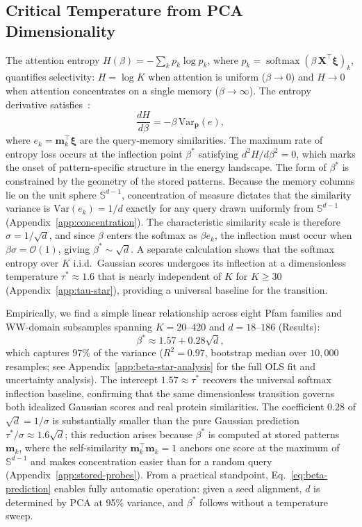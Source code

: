 \subsection{Critical Temperature from PCA Dimensionality}\label{sec:beta-star}
The attention entropy $H(\beta) = -\sum_k p_k \log p_k$, where $p_k = \operatorname{softmax}(\beta\,\mathbf{X}^\top\boldsymbol{\xi})_k$, quantifies selectivity: $H = \log K$ when attention is uniform ($\beta \to 0$) and $H \to 0$ when attention concentrates on a single memory ($\beta \to \infty$). The entropy derivative satisfies~\cite{alswaidanVarnerStochasticAttention2026}:
\begin{equation}\label{eq:entropy-deriv}
    \frac{dH}{d\beta} = -\beta\,\mathrm{Var}_{\mathbf{p}}(e),
\end{equation}
where $e_k = \mathbf{m}_k^\top\boldsymbol{\xi}$ are the query-memory similarities. The maximum rate of entropy loss occurs at the inflection point $\beta^*$ satisfying $d^2H/d\beta^2 = 0$, which marks the onset of pattern-specific structure in the energy landscape. The form of $\beta^*$ is constrained by the geometry of the stored patterns. Because the memory columns lie on the unit sphere $\mathbb{S}^{d-1}$, concentration of measure dictates that the similarity variance is $\mathrm{Var}(e_k) = 1/d$ exactly for any query drawn uniformly from $\mathbb{S}^{d-1}$ (Appendix~\ref{app:concentration}). The characteristic similarity scale is therefore $\sigma = 1/\sqrt{d}$, and since $\beta$ enters the softmax as $\beta e_k$, the inflection must occur when $\beta\sigma = \mathcal{O}(1)$, giving $\beta^* \sim \sqrt{d}$. A separate calculation shows that the softmax entropy over $K$ i.i.d.\ Gaussian scores undergoes its inflection at a dimensionless temperature $\tau^* \approx 1.6$ that is nearly independent of $K$ for $K \geq 30$ (Appendix~\ref{app:tau-star}), providing a universal baseline for the transition.

Empirically, we find a simple linear relationship across eight Pfam families and WW-domain subsamples spanning $K = 20$--$420$ and $d = 18$--$186$ (Results):
\begin{equation}\label{eq:beta-prediction}
    \beta^* \approx 1.57 + 0.28\sqrt{d},
\end{equation}
which captures 97\% of the variance ($R^2 = 0.97$, bootstrap median over $10{,}000$ resamples; see Appendix~\ref{app:beta-star-analysis} for the full OLS fit and uncertainty analysis). The intercept $1.57 \approx \tau^*$ recovers the universal softmax inflection baseline, confirming that the same dimensionless transition governs both idealized Gaussian scores and real protein similarities. The coefficient $0.28$ of $\sqrt{d} = 1/\sigma$ is substantially smaller than the pure Gaussian prediction $\tau^*/\sigma \approx 1.6\sqrt{d}$; this reduction arises because $\beta^*$ is computed at stored patterns $\mathbf{m}_k$, where the self-similarity $\mathbf{m}_k^\top\mathbf{m}_k = 1$ anchors one score at the maximum of $\mathbb{S}^{d-1}$ and makes concentration easier than for a random query (Appendix~\ref{app:stored-probes}). From a practical standpoint, Eq.~\eqref{eq:beta-prediction} enables fully automatic operation: given a seed alignment, $d$ is determined by PCA at 95\% variance, and $\beta^*$ follows without a temperature sweep.


